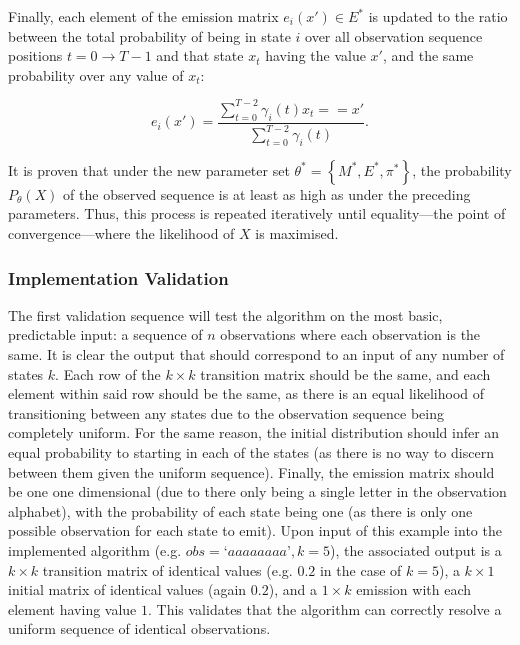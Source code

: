 \documentclass[a4paper, 11pt]{article}
\begin{document}
	Finally, each element of the emission matrix $e_{i} \left(x' \right) \in E^{*}$ is updated to the ratio between the total probability of being in state $i$ over all observation sequence positions $t = 0 \to T-1$ and that state  $x_{t}$ having the value $x'$, and the same probability over any value of $x_{t}$:
	
	\begin{equation}
		e_{i} \left(x' \right) = \frac{\sum_{t=0}^{T-2} \gamma_{i} \left(t \right) x_{t} == x'}{\sum_{t=0}^{T-2} \gamma_{i} \left(t \right)}
		\text{.}
		\label{eq:emission}
	\end{equation}
	
	It is proven that under the new parameter set $\theta^{*} = \left\{M^{*}, E^{*}, \pi^{*} \right\}$, the probability $P_{\theta} \left(X \right)$ of the observed sequence is at least as high as under the preceding parameters. Thus, this process is repeated iteratively until equality---the point of convergence---where the likelihood of $X$ is maximised.
	
	\subsubsection{Implementation Validation}
	
	The first validation sequence will test the algorithm on the most basic, predictable input: a sequence of $n$ observations where each observation is the same. It is clear the output that should correspond to an input of any number of states $k$. Each row of the $k \times k$ transition matrix should be the same, and each element within said row should be the same, as there is an equal likelihood of transitioning between any states due to the observation sequence being completely uniform. For the same reason, the initial distribution should infer an equal probability to starting in each of the states (as there is no way to discern between them given the uniform sequence). Finally, the emission matrix should be one one dimensional (due to there only being a single letter in the observation alphabet), with the probability of each state being one (as there is only one possible observation for each state to emit). Upon input of this example into the implemented algorithm (e.g. $obs = \text{`}aaaaaaaa\text{'}, k = 5$), the associated output is a $k \times k$ transition matrix of identical values (e.g. $0.2$ in the case of $k=5$), a $k \times 1$ initial matrix of identical values (again $0.2$), and a $1 \times k$ emission with each element having value $1$. This validates that the algorithm can correctly resolve a uniform sequence of identical observations.
\end{document}

